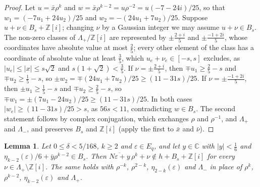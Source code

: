 \documentclass[11pt,a4paper]{amsart}
\newtheorem{lemma}{Lemma}
\theoremstyle{remark}
\newcommand{\Z}{\mathbb{Z}}
\newcommand{\C}{\mathbb{C}}
\begin{document}
\begin{proof}
Let $u=\bar x\rho^k$ and $w=\bar x\rho^{k-2}=u\rho^{-2}=u(-7-24i)/25$, so that $w_1=(-7u_1+24u_2)/25$ and
$w_2=-(24u_1+7u_2)/25$. Suppose $u+\nu\in B_s+\Z[i]$; changing $\nu$ by a Gaussian integer we may assume
$u+\nu\in B_s$. The non-zero classes of $\Lambda_+/\Z[i]$ are represented by $\pm\frac{2+i}5$ and
$\pm\frac{-1+2i}5$, whose coordinates have absolute value at most $\frac25$; every other element of the class has a
coordinate of absolute value at least $\frac35$, which $u_e+\nu_e\in[-s,s]$ excludes, as $|u_e|\le|x|\le s\sqrt2$ and
$s(1+\sqrt2)<\frac35$. If $\nu=\pm\frac{2+i}5$, then $\mp u_1\ge\frac25-s$ and $\mp u_2\ge\frac15-s$, so
$\pm w_2=\mp(24u_1+7u_2)/25\ge(11-31s)/25$. If $\nu=\pm\frac{-1+2i}5$, then $\pm u_1\ge\frac15-s$ and $\mp
u_2\ge\frac25-s$, so $\mp w_1=\pm(7u_1-24u_2)/25\ge(11-31s)/25$. In both cases
$|w_e|\ge(11-31s)/25>s$, as $56s<11$, contradicting $w\in B_s$. The second statement follows by complex conjugation,
which exchanges $\rho$ and $\rho^{-1}$, and $\Lambda_+$ and $\Lambda_-$, and preserves $B_s$ and $\Z[i]$ (apply the
first to $\bar x$ and $\bar\nu$).
\end{proof}

\begin{lemma}\label{lem:gapQ}
Let $0\le\delta<5/168$, $k\ge2$ and $\varepsilon\in E_q$, and let $y\in\C$ with $|y|<\frac16$ and
$\eta_{k-2}(\varepsilon)/6+\bar y\rho^{k-2}\in B_s$. Then $\overline{N\varepsilon+y}\,\rho^k+\nu\notin h+B_s+\Z[i]$ for
every $\nu\in\Lambda_+\setminus\Z[i]$. The same holds with $\rho^{-k}$, $\rho^{2-k}$, $\eta_{2-k}(\varepsilon)$ and
$\Lambda_-$ in place of $\rho^k$, $\rho^{k-2}$, $\eta_{k-2}(\varepsilon)$ and $\Lambda_+$.
\end{lemma}
\end{document}
